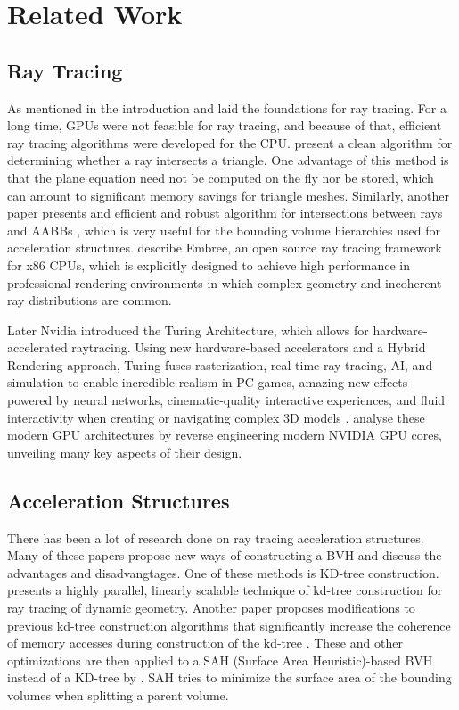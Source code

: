 
\chapter{Related Work}\label{chap:related_work}

\section{Ray Tracing}

As mentioned in the introduction \textcite{appel-1968} and \textcite{whitted-1980} laid the foundations for ray tracing. For a long time, GPUs were not feasible for ray tracing, and because of that, efficient ray tracing algorithms were developed for the CPU. \textcite{ray-triangle-intersection} present a clean algorithm for determining whether a ray intersects a triangle. One advantage of this method is that the plane equation need not be computed on the fly nor be stored, which can amount to significant memory savings for triangle meshes. Similarly, another paper presents and efficient and robust algorithm for intersections between rays and AABBs \parencite{ray-box-intersection}, which is very useful for the bounding volume hierarchies used for acceleration structures. \textcite{embree} describe Embree, an open source ray tracing framework for x86 CPUs, which is explicitly designed to achieve high performance in professional rendering environments in which complex geometry and incoherent ray distributions are common.

Later Nvidia introduced the Turing Architecture, which allows for hardware-accelerated raytracing. Using new hardware-based accelerators and a Hybrid Rendering approach, Turing fuses rasterization, real-time ray tracing, AI, and simulation to enable incredible realism in PC games, amazing new effects powered by neural networks, cinematic-quality interactive experiences, and fluid interactivity when creating or navigating complex 3D models \parencite{turing-arch}. \textcite{gpu-analysis} analyse these modern GPU architectures by reverse engineering modern NVIDIA GPU cores, unveiling many key aspects of their design.

\section{Acceleration Structures}

There has been a lot of research done on ray tracing acceleration structures. Many of these papers propose new ways of constructing a BVH and discuss the advantages and disadvangtages. One of these methods is KD-tree construction. \textcite{parallel-kd-tree} presents a highly parallel, linearly scalable technique of kd-tree construction for ray tracing of dynamic geometry. Another paper proposes modifications to previous kd-tree construction algorithms that significantly increase the coherence of memory accesses during construction of the kd-tree \parencite{kd-tree-streaming}. These and other optimizations are then applied to a SAH (Surface Area Heuristic)-based BVH instead of a KD-tree by \textcite{fast-sah-bvh}. SAH tries to minimize the surface area of the bounding volumes when splitting a parent volume.

